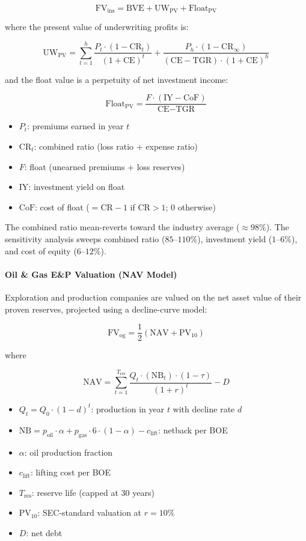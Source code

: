 $$
\text{FV}_{\text{ins}} = \text{BVE} + \text{UW}_{\text{PV}} + \text{Float}_{\text{PV}}
$$

where the present value of underwriting profits is:

$$
\text{UW}_{\text{PV}} = \sum_{t=1}^{h} \frac{P_t \cdot (1 - \text{CR}_t)}{(1 + \text{CE})^t} + \frac{P_{h} \cdot (1 - \text{CR}_{\infty})}{(\text{CE} - \text{TGR}) \cdot (1 + \text{CE})^h}
$$

and the float value is a perpetuity of net investment income:

$$
\text{Float}_{\text{PV}} = \frac{F \cdot (\text{IY} - \text{CoF})}{\text{CE} - \text{TGR}}
$$

\begin{itemize}
  \item[] $P_t$: premiums earned in year $t$
  \item[] $\text{CR}_t$: combined ratio (loss ratio + expense ratio)
  \item[] $F$: float (unearned premiums + loss reserves)
  \item[] $\text{IY}$: investment yield on float
  \item[] $\text{CoF}$: cost of float ($= \text{CR} - 1$ if $\text{CR} > 1$; 0 otherwise)
\end{itemize}

The combined ratio mean-reverts toward the industry average ($\approx 98\%$). The sensitivity analysis sweeps combined ratio ($85\text{--}110\%$), investment yield ($1\text{--}6\%$), and cost of equity ($6\text{--}12\%$).

\paragraph{Oil \& Gas E\&P Valuation (NAV Model)}

Exploration and production companies are valued on the net asset value of their proven reserves, projected using a decline-curve model:

$$
\text{FV}_{\text{og}} = \frac{1}{2}\left(\text{NAV} + \text{PV}_{10}\right)
$$

where

$$
\text{NAV} = \sum_{t=1}^{T_{\text{res}}} \frac{Q_t \cdot (\text{NB}_t) \cdot (1 - \tau)}{(1 + r)^t} - D
$$

\begin{itemize}
  \item[] $Q_t = Q_0 \cdot (1 - d)^t$: production in year $t$ with decline rate $d$
  \item[] $\text{NB} = p_{\text{oil}} \cdot \alpha + p_{\text{gas}} \cdot 6 \cdot (1 - \alpha) - c_{\text{lift}}$: netback per BOE
  \item[] $\alpha$: oil production fraction
  \item[] $c_{\text{lift}}$: lifting cost per BOE
  \item[] $T_{\text{res}}$: reserve life (capped at 30 years)
  \item[] $\text{PV}_{10}$: SEC-standard valuation at $r = 10\%$
  \item[] $D$: net debt
\end{itemize}

